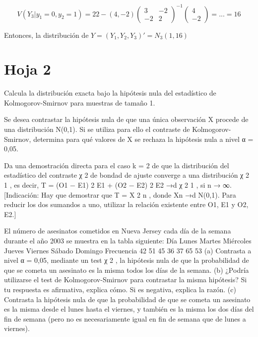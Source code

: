 \begin{problem}[7]
\[
V(Y_3|y_1=0,y_2=1) = 22 - (4,-2) \begin{pmatrix} 3&-2\\-2&2 \end{pmatrix}^{-1} \begin{pmatrix}4\\-2\end{pmatrix} = ... = 16
\]


Entonces, la distribución de $Y = (Y_1,Y_2,Y_3)' = N_3(1,16)$

\end{problem}


\section{Hoja 2}


\begin{problem}[1] Calcula la distribución exacta bajo la hipótesis nula del estadístico de Kolmogorov-Smirnov para
muestras de tamaño 1.

\solution

\end{problem}
\begin{problem}[2] Se desea contrastar la hipótesis nula de que una única observación X procede de una distribución
N(0,1). Si se utiliza para ello el contraste de Kolmogorov-Smirnov, determina para qué valores de
X se rechaza la hipótesis nula a nivel α = 0,05.
\solution

\end{problem}
\begin{problem}[3] Da una demostración directa para el caso k = 2 de que la distribución del estadístico del contraste
χ
2 de bondad de ajuste converge a una distribución χ
2
1
, es decir,
T =
(O1 − E1)
2
E1
+
(O2 − E2)
2
E2
→d χ
2
1
, si n → ∞.
[Indicación: Hay que demostrar que T = X
2
n
, donde Xn →d N(0,1). Para reducir los dos sumandos
a uno, utilizar la relación existente entre O1, E1 y O2, E2.]
\solution

\end{problem}
\begin{problem}[4] El número de asesinatos cometidos en Nueva Jersey cada día de la semana durante el año 2003
se muestra en la tabla siguiente:
Día Lunes Martes Miércoles Jueves Viernes Sábado Domingo
Frecuencia 42 51 45 36 37 65 53
(a) Contrasta a nivel α = 0,05, mediante un test χ
2
, la hipótesis nula de que la probabilidad de que
se cometa un asesinato es la misma todos los días de la semana.
(b) ¿Podría utilizarse el test de Kolmogorov-Smirnov para contrastar la misma hipótesis? Si tu
respuesta es afirmativa, explica cómo. Si es negativa, explica la razón.
(c) Contrasta la hipótesis nula de que la probabilidad de que se cometa un asesinato es la misma
desde el lunes hasta el viernes, y también es la misma los dos días del fin de semana (pero no es
necesariamente igual en fin de semana que de lunes a viernes).
\solution

\end{problem}
